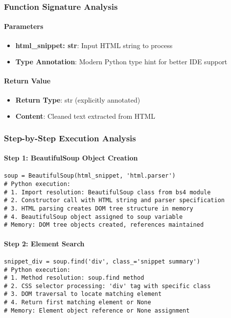 \subsubsection{Function Signature Analysis}

\paragraph{Parameters}
\begin{itemize}
\item \textbf{html\_snippet: str}: Input HTML string to process
\item \textbf{Type Annotation}: Modern Python type hint for better IDE support
\end{itemize}

\paragraph{Return Value}
\begin{itemize}
\item \textbf{Return Type}: str (explicitly annotated)
\item \textbf{Content}: Cleaned text extracted from HTML
\end{itemize}

\subsubsection{Step-by-Step Execution Analysis}

\paragraph{Step 1: BeautifulSoup Object Creation}
\begin{lstlisting}[caption=HTML Parser Initialization]
soup = BeautifulSoup(html_snippet, 'html.parser')
# Python execution:
# 1. Import resolution: BeautifulSoup class from bs4 module
# 2. Constructor call with HTML string and parser specification
# 3. HTML parsing creates DOM tree structure in memory
# 4. BeautifulSoup object assigned to soup variable
# Memory: DOM tree objects created, references maintained
\end{lstlisting}

\paragraph{Step 2: Element Search}
\begin{lstlisting}[caption=DOM Navigation Analysis]
snippet_div = soup.find('div', class_='snippet summary')
# Python execution:
# 1. Method resolution: soup.find method
# 2. CSS selector processing: 'div' tag with specific class
# 3. DOM traversal to locate matching element
# 4. Return first matching element or None
# Memory: Element object reference or None assignment
\end{lstlisting}

